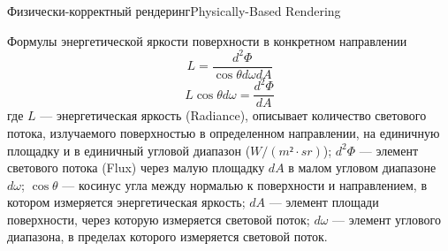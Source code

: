 \documentclass{beamer}
\begin{document}
	
	\begin{frame}{Физически-корректный рендеринг}{Physically-Based Rendering}

		Формулы энергетической яркости поверхности в конкретном направлении
		\[
			L = \frac{d^2 \Phi}{\cos \theta d \omega d A}
		\] 
		\[
			L \cos \theta d \omega = \frac{d^2 \Phi}{ d A}
		\] 
		где 
		$L$ --- энергетическая яркость (Radiance), описывает количество светового потока, излучаемого поверхностью в определенном направлении, на единичную площадку и в единичный угловой диапазон ($W/(m²\cdot sr)$);
		$d^2 \Phi$ --- элемент светового потока (Flux) через малую площадку $dA$  в малом угловом диапазоне $d \omega$;
		$\cos \theta$ --- косинус угла между нормалью к поверхности и направлением, в котором измеряется энергетическая яркость;
		$dA$ --- элемент площади поверхности, через которую измеряется световой поток;
		$d \omega$ --- элемент углового диапазона, в пределах которого измеряется световой поток.
		
	\end{frame}
	
\end{document}
